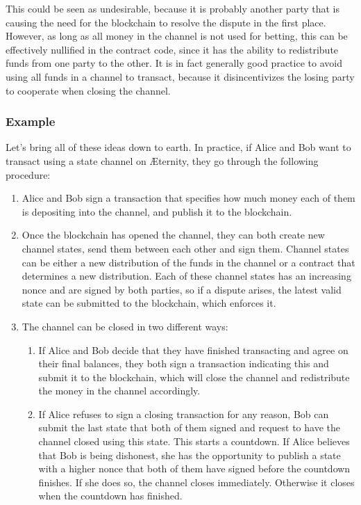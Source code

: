 \documentclass[a4paper, 10pt, conference]{ieeeconf}      %
\begin{document}
\begin{draft}
This could be seen as undesirable, because it is probably another party that is causing the need for the blockchain to resolve the dispute in the first place. However, as long as all money in the channel is not used for betting, this can be effectively nullified in the contract code, since it has the ability to redistribute funds from one party to the other. It is in fact generally good practice to avoid using all funds in a channel to transact, because it disincentivizes the losing party to cooperate when closing the channel.

\subsubsection{Example}
Let's bring all of these ideas down to earth. In practice, if Alice and Bob want to transact using a state channel on Æternity, they go through the following procedure:

\begin{enumerate} 
   \item Alice and Bob sign a transaction that specifies how much money each of them is depositing into the channel, and publish it to the blockchain.
   \item Once the blockchain has opened the channel, they can both create new channel states, send them between each other and sign them. Channel states can be either a new distribution of the funds in the channel or a contract that determines a new distribution. Each of these channel states has an increasing nonce and are signed by both parties, so if a dispute arises, the latest valid state can be submitted to the blockchain, which enforces it.
   \item The channel can be closed in two different ways:
   \begin{enumerate} 
       \item If Alice and Bob decide that they have finished transacting and agree on their final balances, they both sign a transaction indicating this and submit it to the blockchain, which will close the channel and redistribute the money in the channel accordingly.
       \item If Alice refuses to sign a closing transaction for any reason, Bob can submit the last state that both of them signed and request to have the channel closed using this state. This starts a countdown. If Alice believes that Bob is being dishonest, she has the opportunity to publish a state with a higher nonce that both of them have signed before the countdown finishes. If she does so, the channel closes immediately. Otherwise it closes when the countdown has finished.
\end{enumerate}
\end{enumerate}

\end{draft}
\end{document}
